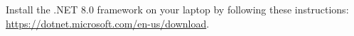 Install the .NET 8.0 framework on your laptop by following these instructions: \url{https://dotnet.microsoft.com/en-us/download}.
